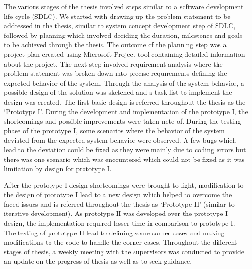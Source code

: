 The various stages of the thesis involved steps similar to a software development life cycle (SDLC). We started with drawing up the problem statement to be addressed in the thesis, similar to system concept development step of SDLC, followed by planning which involved deciding the duration, milestones and goals to be achieved through the thesis. The outcome of the planning step was a project plan created using Microsoft Project tool containing detailed information about the project. The next step involved requirement analysis where the problem statement was broken down into precise requirements defining the expected behavior of the system. Through the analysis of the system behavior, a possible design of the solution was sketched and a task list to implement the design was created. The first basic design is referred throughout the thesis as the {\lq}Prototype I{\rq}. During the development and implementation of the prototype I, the shortcomings and possible improvements were taken note of. During the testing phase of the prototype I, some scenarios where the behavior of the system deviated from the expected system behavior were observed. A few bugs which lead to the deviation could be fixed as they were mainly due to coding errors but there was one scenario which was encountered which could not be fixed as it was limitation by design for prototype I. \newline

After the prototype I design shortcomings were brought to light, modification to the design of prototype I lead to a new design which helped to overcome the faced issues and is referred throughout the thesis as {\lq}Prototype II{\rq} (similar to iterative development). As prototype II was developed over the prototype I design, the implementation required lesser time in comparison to prototype I. The testing of prototype II lead to defining some corner cases and making modifications to the code to handle the corner cases. Throughout the different stages of thesis, a weekly meeting with the supervisors was conducted to provide an update on the progress of thesis as well as to seek guidance.


